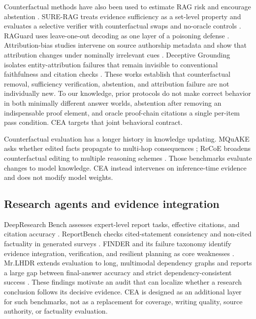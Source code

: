 \documentclass[10pt,twocolumn]{article}
\newcommand{\method}{\textsc{CEA}}
\begin{document}
Counterfactual methods have also been used to estimate RAG risk and encourage abstention \citep{chen2024risk}. SURE-RAG treats evidence sufficiency as a set-level property and evaluates a selective verifier with counterfactual swaps and no-oracle controls \citep{qiu2026surerag}. RAGuard uses leave-one-out decoding as one layer of a poisoning defense \citep{kumar2026raguard}. Attribution-bias studies intervene on source authorship metadata and show that attribution changes under nominally irrelevant cues \citep{abolghasemi2024bias}. Deceptive Grounding isolates entity-attribution failures that remain invisible to conventional faithfulness and citation checks \citep{caruzzo2026deceptive}. These works establish that counterfactual removal, sufficiency verification, abstention, and attribution failure are not individually new. To our knowledge, prior protocols do not make correct behavior in both minimally different answer worlds, abstention after removing an indispensable proof element, and oracle proof-chain citations a single per-item pass condition. \method{} targets that joint behavioral contract.

Counterfactual evaluation has a longer history in knowledge updating. MQuAKE asks whether edited facts propagate to multi-hop consequences \citep{zhong2023mquake}; ReCoE broadens counterfactual editing to multiple reasoning schemes \citep{hua2024recoe}. Those benchmarks evaluate changes to model knowledge. \method{} instead intervenes on inference-time evidence and does not modify model weights.

\subsection{Research agents and evidence integration}

DeepResearch Bench assesses expert-level report tasks, effective citations, and citation accuracy \citep{du2025deepresearch}. ReportBench checks cited-statement consistency and non-cited factuality in generated surveys \citep{li2025reportbench}. FINDER and its failure taxonomy identify evidence integration, verification, and resilient planning as core weaknesses \citep{zhang2025finder}. Mr.LHDR extends evaluation to long, multimodal dependency graphs and reports a large gap between final-answer accuracy and strict dependency-consistent success \citep{guo2026mrlhdr}. These findings motivate an audit that can localize whether a research conclusion follows its decisive evidence. \method{} is designed as an additional layer for such benchmarks, not as a replacement for coverage, writing quality, source authority, or factuality evaluation.
\end{document}
